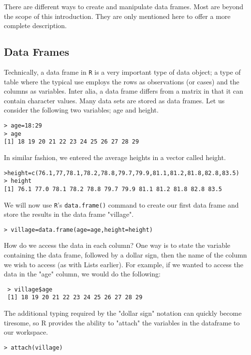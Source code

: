 \documentclass[a4paper,12pt]{article}
\begin{document}
There are different ways to create and manipulate data frames. Most are beyond the scope of this introduction. They are only mentioned here to offer a more complete description.

\subsection{Data Frames}
Technically, a data frame in \texttt{R} is a very important type of data object;  a type of table where the typical use employs the rows as observations (or cases) and the columns as variables.
Inter alia, a data frame differs from a matrix in that it can contain character values.
Many data sets are stored as data frames.
Let us consider the following two variables; age and height.
\begin{verbatim}
> age=18:29
> age
[1] 18 19 20 21 22 23 24 25 26 27 28 29
\end{verbatim}

In similar fashion, we entered the average heights in a vector called height.
\begin{verbatim}
>height=c(76.1,77,78.1,78.2,78.8,79.7,79.9,81.1,81.2,81.8,82.8,83.5)
> height
[1] 76.1 77.0 78.1 78.2 78.8 79.7 79.9 81.1 81.2 81.8 82.8 83.5
\end{verbatim}

We will now use \texttt{R}'s \texttt{data.frame()} command to create our first data frame and store the results in the data frame "village".
\begin{framed}
\begin{verbatim}
> village=data.frame(age=age,height=height)
\end{verbatim}
\end{framed}

How do we access the data in each column? One way is to state the variable containing the data frame, followed by a dollar sign, then the name of the column we wish to access (as with Lists earlier).
For example, if we wanted to access the data in the "age" column, we would do the following:
\begin{verbatim}
 > village$age
 [1] 18 19 20 21 22 23 24 25 26 27 28 29
\end{verbatim}
The additional typing required by the "dollar sign" notation can quickly become tiresome, so R provides the ability to "attach" the variables in the dataframe to our workspace.
\begin{verbatim}
> attach(village)
\end{verbatim}
\end{document}
